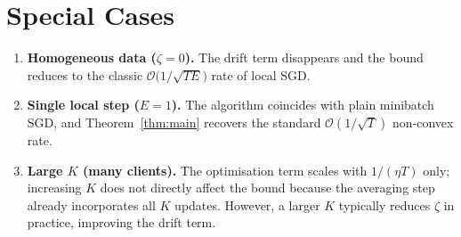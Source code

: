 \documentclass{article}
\begin{document}
\section*{Special Cases}
\begin{enumerate}
\item \textbf{Homogeneous data ($\zeta=0$).} The drift term disappears and the bound reduces to the classic $\mathcal{O}\big(1/\sqrt{TE}\big)$ rate of local SGD.
\item \textbf{Single local step ($E=1$).} The algorithm coincides with plain minibatch SGD, and Theorem~\ref{thm:main} recovers the standard $\mathcal{O}(1/\sqrt{T})$ non‑convex rate.
\item \textbf{Large $K$ (many clients).} The optimisation term scales with $1/(\eta T)$ only; increasing $K$ does not directly affect the bound because the averaging step already incorporates all $K$ updates. However, a larger $K$ typically reduces $\zeta$ in practice, improving the drift term.
\end{enumerate}
\end{document}
